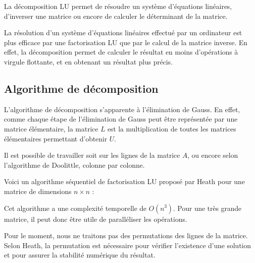 \documentclass[12pt,letterpaper]{article} %
\begin{document}
La décomposition LU permet de résoudre un système d'équations linéaires, d'inverser une
matrice ou encore de calculer le déterminant de la matrice\cite{wikipedia-LU}.

La résolution d'un système d'équations linéaires effectué par un ordinateur 
est plus efficace par une factorisation LU que par le calcul de la matrice inverse.
En effet, la décomposition permet de calculer le résultat en moins d'opérations
à virgule flottante, et en obtenant un résultat plus précis\cite{lay2006LinAlgitsAppThiedi}.

\subsection{Algorithme de décomposition}

L'algorithme de décomposition s'apparente à l'élimination de Gauss. En effet, comme chaque
étape de l'élimination de Gauss peut être représentée par une matrice élémentaire,
la matrice $L$ est la multiplication de toutes les matrices élémentaires permettant
d'obtenir $U$\cite{lay2006LinAlgitsAppThiedi}.

Il est possible de travailler soit sur les lignes de la matrice $A$, ou encore selon
l'algorithme de Doolittle, colonne par colonne\cite{wikipedia-LU}.

Voici un algorithme séquentiel de factorisation LU proposé par 
Heath pour une matrice de dimensions $n \times n$ \cite{parallel-lu}:

\begin{algorithm}
\end{algorithm}

Cet algorithme a une complexité temporelle de $O(n^3)$. Pour une très grande matrice, il peut
donc être utile de paralléliser les opérations.

Pour le moment, nous ne traitons pas des permutations des lignes de la matrice. 
Selon Heath, la permutation est nécessaire pour vérifier l'existence d'une solution et
pour assurer la stabilité numérique du résultat\cite{parallel-lu}.
\end{document}
